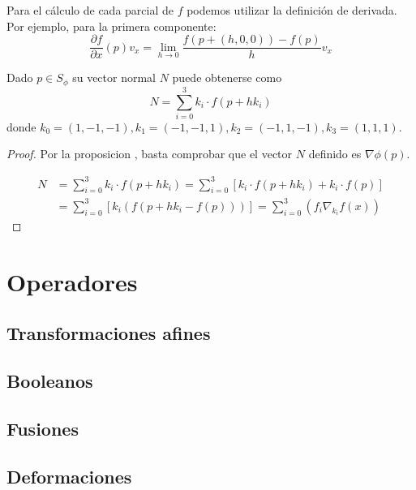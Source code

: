 Para el cálculo de cada parcial de $f$ podemos utilizar la definición de derivada. Por ejemplo, para la primera componente:
\begin{equation*}
    \frac{\partial{f}}{\partial{x}}(p) v_x = \lim_{h\to 0}\frac{f(p + (h,0,0)) - f(p)}{h} v_x
\end{equation*}

\begin{proposicion}
    Dado $p\in S_\phi$ su vector normal $N$ puede obtenerse como
    \begin{equation*}
        N = \sum_{i=0}^3 k_i\cdot f(p + hk_i)
    \end{equation*}
    donde $k_0 = (1,-1,-1), k_1 = (-1,-1,1), k_2=(-1,1,-1), k_3=(1,1,1)$.
\end{proposicion}

\begin{proof}
    Por la proposicion , basta comprobar que el vector $N$ definido es $\nabla \phi(p)$.

    \begin{align*}
        N & = \sum_{i=0}^3 k_i\cdot f(p + hk_i) = \sum_{i=0}^3\left[ k_i\cdot f(p + hk_i) + k_i\cdot f(p) \right] \\
          & = \sum_{i=0}^3 \left[k_i\left( f(p+hk_i - f(p)) \right) \right] = \sum_{i=0}^3(f_i \nabla_{k_i}f(x))
    \end{align*}
\end{proof}

\section{Operadores}
\subsection{Transformaciones afines}
\subsection{Booleanos}
\subsection{Fusiones}
\subsection{Deformaciones}